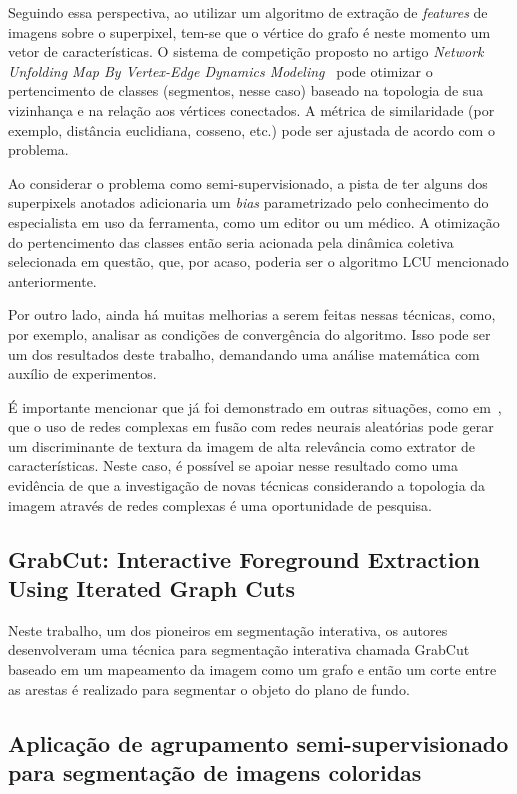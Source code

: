 Seguindo essa perspectiva, ao utilizar um algoritmo de extração de
\textit{features} de imagens sobre o superpixel, tem-se que o vértice
do grafo é neste momento um vetor de características. O sistema de
competição proposto no artigo \textit{Network Unfolding Map By
Vertex-Edge Dynamics Modeling}~\cite{VerriNetworkUnfoldingMap2018}
pode otimizar o pertencimento de classes (segmentos, nesse caso)
baseado na topologia de sua vizinhança e na relação aos vértices
conectados. A métrica de similaridade (por exemplo, distância
euclidiana, cosseno, etc.) pode ser ajustada de acordo com o problema.

Ao considerar o problema como semi-supervisionado, a pista de ter
alguns dos superpixels anotados adicionaria um \textit{bias}
parametrizado pelo conhecimento do especialista em uso da ferramenta,
como um editor ou um médico. A otimização do pertencimento das classes
então seria acionada pela dinâmica coletiva selecionada em questão,
que, por acaso, poderia ser o algoritmo \gls{LCU} mencionado anteriormente.

Por outro lado, ainda há muitas melhorias a serem feitas nessas técnicas, como,
por exemplo, analisar as condições de convergência do algoritmo. Isso
pode ser um dos resultados deste trabalho, demandando uma análise
matemática com auxílio de experimentos.

É importante mencionar que já foi demonstrado em outras situações,
como em~\cite{JarbasComplexNetworks2020}, que o uso de redes complexas
em fusão com redes neurais aleatórias pode gerar um discriminante de
textura da imagem de alta relevância como extrator de
características. Neste caso, é possível se apoiar nesse resultado como
uma evidência de que a investigação de novas técnicas considerando a
topologia da imagem através de redes complexas é uma oportunidade de
pesquisa.


\subsection{GrabCut: Interactive Foreground Extraction Using Iterated
  Graph Cuts}\label{sec:grabcut}

Neste trabalho, um dos pioneiros em segmentação interativa, os
autores~ desenvolveram uma técnica para segmentação interativa
chamada GrabCut baseado em um mapeamento da imagem como um grafo e
então um corte entre as arestas é realizado para segmentar o objeto do
plano de fundo.


\subsection{Aplicação de agrupamento semi-supervisionado para segmentação
  de imagens coloridas}\label{sec:franciscolira2018}

